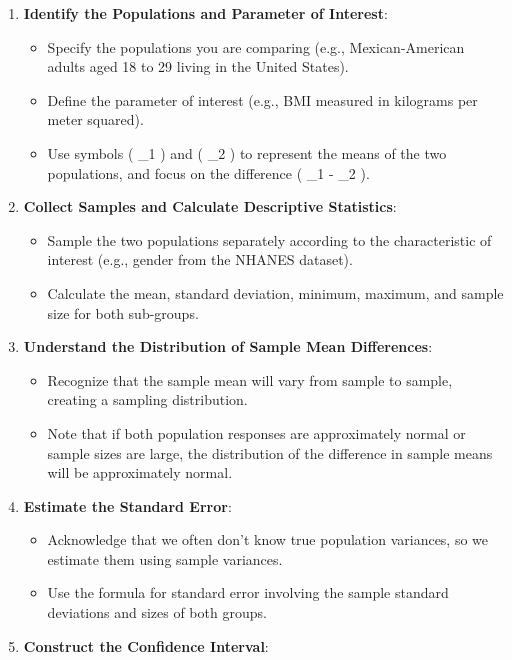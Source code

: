 \documentclass[
  letterpaper,
  DIV=11,
  numbers=noendperiod]{scrartcl}
\providecommand{\tightlist}{%
  \setlength{\itemsep}{0pt}\setlength{\parskip}{0pt}}\usepackage{longtable,booktabs,array}
\begin{document}
\begin{enumerate}
\def\labelenumi{\arabic{enumi}.}
\tightlist
\item
  \textbf{Identify the Populations and Parameter of Interest}:

  \begin{itemize}
  \tightlist
  \item
    Specify the populations you are comparing (e.g., Mexican-American
    adults aged 18 to 29 living in the United States).
  \item
    Define the parameter of interest (e.g., BMI measured in kilograms
    per meter squared).
  \item
    Use symbols ( \mu\_1 ) and ( \mu\_2 ) to represent the means of the
    two populations, and focus on the difference ( \mu\_1 - \mu\_2 ).
  \end{itemize}
\item
  \textbf{Collect Samples and Calculate Descriptive Statistics}:

  \begin{itemize}
  \tightlist
  \item
    Sample the two populations separately according to the
    characteristic of interest (e.g., gender from the NHANES dataset).
  \item
    Calculate the mean, standard deviation, minimum, maximum, and sample
    size for both sub-groups.
  \end{itemize}
\item
  \textbf{Understand the Distribution of Sample Mean Differences}:

  \begin{itemize}
  \tightlist
  \item
    Recognize that the sample mean will vary from sample to sample,
    creating a sampling distribution.
  \item
    Note that if both population responses are approximately normal or
    sample sizes are large, the distribution of the difference in sample
    means will be approximately normal.
  \end{itemize}
\item
  \textbf{Estimate the Standard Error}:

  \begin{itemize}
  \tightlist
  \item
    Acknowledge that we often don't know true population variances, so
    we estimate them using sample variances.
  \item
    Use the formula for standard error involving the sample standard
    deviations and sizes of both groups.
  \end{itemize}
\item
  \textbf{Construct the Confidence Interval}:


\end{enumerate}
\end{document}
